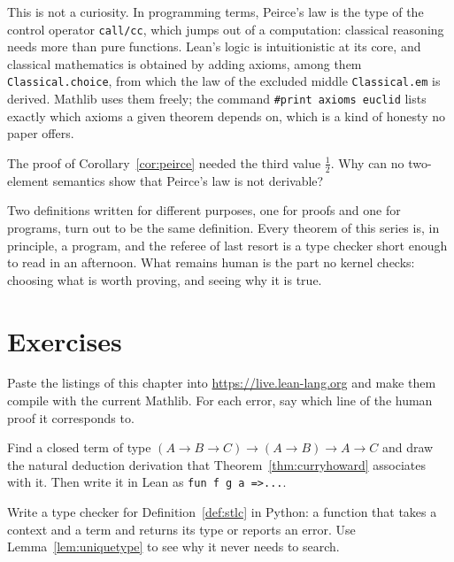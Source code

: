 This is not a curiosity. In programming terms, Peirce's law is the type of the control operator \texttt{call/cc}, which jumps out of a computation: classical reasoning needs more than pure
functions. Lean's logic is intuitionistic at its core, and classical mathematics is obtained by adding axioms, among them \texttt{Classical.choice}, from which the law of the excluded middle
\texttt{Classical.em} is derived. Mathlib uses them freely; the command \texttt{\#print axioms euclid} lists exactly which axioms a given theorem depends on, which is a kind of honesty
no paper offers.

\begin{think}
The proof of Corollary~\ref{cor:peirce} needed the third value $\frac12$. Why can no two-element semantics show that Peirce's law is not derivable?
\end{think}

\begin{beauty}
Two definitions written for different purposes, one for proofs and one for programs, turn out to be the same definition. Every theorem of this series is, in principle, a program, and
the referee of last resort is a type checker short enough to read in an afternoon. What remains human is the part no kernel checks: choosing what is worth proving, and seeing why it is true.
\end{beauty}

\section{Exercises}

\begin{exercise}[$\star$]\label{ex:leanrun}
Paste the listings of this chapter into \url{https://live.lean-lang.org} and make them compile with the current Mathlib. For each error, say which line of the human proof it corresponds to.
\end{exercise}

\begin{exercise}[$\star$]\label{ex:sterm}
Find a closed term of type $(A\to B\to C)\to(A\to B)\to A\to C$ and draw the natural deduction derivation that Theorem~\ref{thm:curryhoward} associates with it. Then write it in Lean as \texttt{fun f g a =>...}.
\end{exercise}

\begin{exercise}[$\star\star$]\label{ex:typecheck}
Write a type checker for Definition~\ref{def:stlc} in Python: a function that takes a context and a term and returns its type or reports an error. Use Lemma~\ref{lem:uniquetype} to see why it never needs to search.
\end{exercise}

